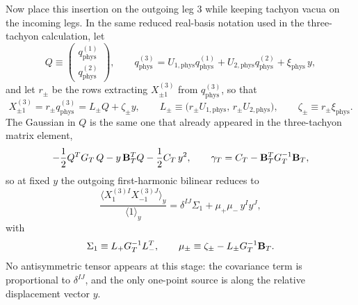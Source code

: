 \documentclass[11pt]{article}
\numberwithin{equation}{section}
\begin{document}
Now place this insertion on the outgoing leg $3$ while keeping tachyon vacua on the incoming legs. In the same reduced real-basis notation used in the three-tachyon calculation, let
\begin{equation}
\label{eq:s12-2-005}
Q\equiv
\begin{pmatrix}
q_{\mathrm{phys}}^{(1)}\\
q_{\mathrm{phys}}^{(2)}
\end{pmatrix},
\qquad
q_{\mathrm{phys}}^{(3)}
=
U_{1,\mathrm{phys}}q_{\mathrm{phys}}^{(1)}
+U_{2,\mathrm{phys}}q_{\mathrm{phys}}^{(2)}
+\xi_{\mathrm{phys}}\,y,
\end{equation}
and let $r_\pm$ be the rows extracting $X_{\pm1}^{(3)}$ from $q_{\mathrm{phys}}^{(3)}$, so that
\begin{equation}
\label{eq:s12-2-006}
X_{\pm1}^{(3)} = r_\pm q_{\mathrm{phys}}^{(3)}
=
L_\pm Q + \zeta_\pm y,
\qquad
L_\pm \equiv \bigl(r_\pm U_{1,\mathrm{phys}},\,r_\pm U_{2,\mathrm{phys}}\bigr),
\qquad
\zeta_\pm \equiv r_\pm \xi_{\mathrm{phys}}.
\end{equation}
The Gaussian in $Q$ is the same one that already appeared in the three-tachyon matrix element,
\begin{equation}
\label{eq:s12-2-007}
-\frac12 Q^T G_T\,Q
- y\,{\bf B}_T^T Q
-\frac12 C_T\,y^2,
\qquad
\gamma_T=C_T-{\bf B}_T^T G_T^{-1}{\bf B}_T,
\end{equation}
so at fixed $y$ the outgoing first-harmonic bilinear reduces to
\begin{equation}
\label{eq:s12-2-008}
\frac{\bigl\langle X_1^{(3)I}X_{-1}^{(3)J}\bigr\rangle_y}
{\langle 1\rangle_y}
=
\delta^{IJ}\Sigma_1
+\mu_+\mu_-\,y^I y^J,
\end{equation}
with
\begin{equation}
\label{eq:s12-2-009}
\Sigma_1 \equiv L_+G_T^{-1}L_-^T,
\qquad
\mu_\pm \equiv \zeta_\pm - L_\pm G_T^{-1}{\bf B}_T.
\end{equation}
No antisymmetric tensor appears at this stage: the covariance term is proportional to $\delta^{IJ}$, and the only one-point source is along the relative displacement vector $y$.
\end{document}
